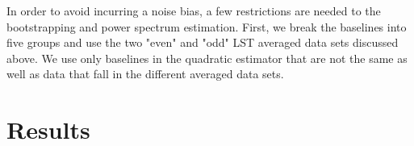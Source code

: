 \documentclass[twocolumn,numberedappendix]{emulateapj} \shorttitle{PSA64}
\begin{document}
In order to avoid incurring a noise bias, a few restrictions are needed to the
bootstrapping and power spectrum estimation. First, we break the baselines into
five groups and use the two "even" and "odd" LST averaged data sets discussed
above. We use only baselines in the quadratic estimator that are not the same
as well as data that fall in the different averaged data sets.




%
%
%
%
%
%
%



%




\section{Results}
\end{document}
